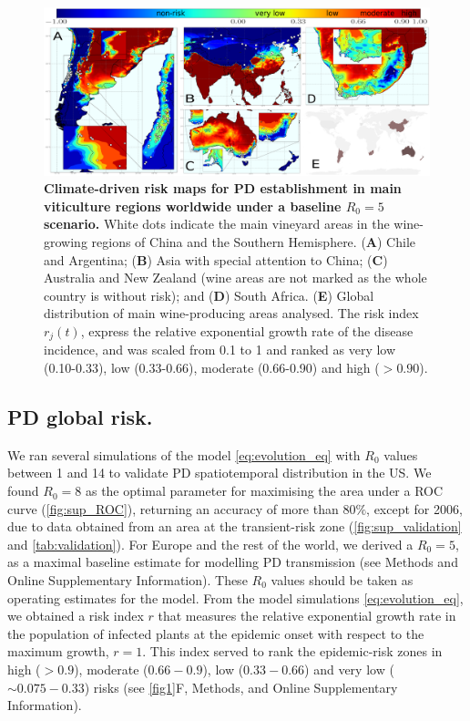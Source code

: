     \begin{figure}[t!]
        \centering
        \includegraphics[width=1\textwidth]{Figures/Fig_global_risk_R0_5.pdf}
        \caption{\textbf{Climate-driven risk maps for PD establishment in main
                viticulture regions worldwide under a baseline $R_0 = 5$
                scenario.} White dots
            indicate the main vineyard areas in the wine-growing regions of
            China and the
            Southern Hemisphere. (\textbf{A}) Chile and Argentina; (\textbf{B})
            Asia with
            special attention to China; (\textbf{C}) Australia and New Zealand
            (wine areas
            are not marked as the whole country is without risk); and
            (\textbf{D}) South
            Africa. (\textbf{E}) Global distribution of main wine-producing
            areas analysed.
            The risk index $r_j(t)$, express the relative exponential growth
            rate of the
            disease incidence, and was scaled from 0.1 to 1 and ranked as very
            low
            (0.10-0.33), low (0.33-0.66), moderate (0.66-0.90) and high ($>
                0.90$).}
        \label{fig3}
    \end{figure}

    \subsection{PD global risk.}
    We ran several simulations of the model \cref{eq:evolution_eq} with $R_0$
    values between 1 and 14 to validate PD spatiotemporal distribution in the
    US.
    We found $R_0=8$ as the optimal parameter for maximising the area under a
    ROC
    curve (\cref{fig:sup_ROC}), returning an accuracy of more than $80 \%$,
    except
    for 2006, due to data obtained from an area at the transient-risk zone
    (\cref{fig:sup_validation} and \cref{tab:validation}). For Europe and the
    rest
    of the world, we derived a $R_0=5$, as a maximal baseline estimate for
    modelling PD transmission (see Methods and Online Supplementary
    Information). These
$R_0$
    values should be taken as operating estimates for the model.  From the
    model
    simulations \cref{eq:evolution_eq}, we obtained a risk index $r$ that
    measures
    the relative exponential growth rate in the population of infected plants
    at
    the epidemic onset with respect to the maximum growth, $r=1$. This index
    served
    to rank the epidemic-risk zones in high ($> 0.9$), moderate ($0.66-0.9$),
    low
    ($0.33-0.66$) and very low ($\sim 0.075-0.33$) risks (see \cref{fig1}F,
    Methods, and Online Supplementary Information).

